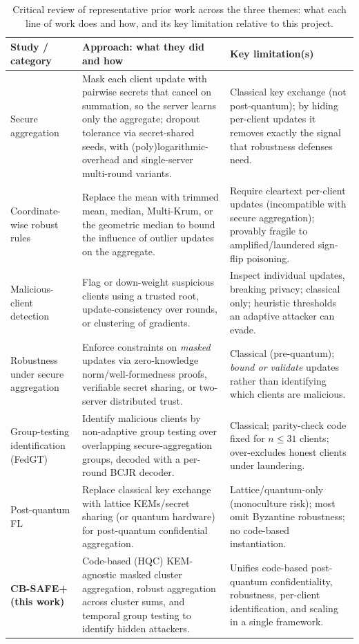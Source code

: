 \documentclass[conference]{IEEEtran}
\begin{document}
\begin{table}[t]
\caption{Critical review of representative prior work across the three themes: what
each line of work does and how, and its key limitation relative to this project.}
\label{tab:lit}
\centering
\footnotesize
\renewcommand{\arraystretch}{1.3}
\begin{tabular}{@{}p{} p{} p{}@{}}
\toprule
\textbf{Study / category} & \textbf{Approach: what they did and how} & \textbf{Key limitation(s)}\\
\midrule
Secure aggregation \cite{bonawitz2017,bell2020,flamingo} &
Mask each client update with pairwise secrets that cancel on summation, so the server
learns only the aggregate; dropout tolerance via secret-shared seeds, with
(poly)logarithmic-overhead and single-server multi-round variants. &
Classical key exchange (not post-quantum); by hiding per-client updates it removes
exactly the signal that robustness defenses need.\\
Coordinate-wise robust rules \cite{blanchard2017,yin2018,bulyan,rfa} &
Replace the mean with trimmed mean, median, Multi-Krum, or the geometric median to
bound the influence of outlier updates on the aggregate. &
Require cleartext per-client updates (incompatible with secure aggregation); provably
fragile to amplified/laundered sign-flip poisoning.\\
Malicious-client detection \cite{fltrust,fldetector2022,flame2022} &
Flag or down-weight suspicious clients using a trusted root, update-consistency over
rounds, or clustering of gradients. &
Inspect individual updates, breaking privacy; classical only; heuristic thresholds an
adaptive attacker can evade.\\
Robustness under secure aggregation \cite{rofl,eiffel,elsa} &
Enforce constraints on \emph{masked} updates via zero-knowledge norm/well-formedness
proofs, verifiable secret sharing, or two-server distributed trust. &
Classical (pre-quantum); \emph{bound or validate} updates rather than identifying
which clients are malicious.\\
Group-testing identification (FedGT) \cite{fedgt} &
Identify malicious clients by non-adaptive group testing over overlapping
secure-aggregation groups, decoded with a per-round BCJR decoder. &
Classical; parity-check code fixed for $n\!\le\!31$ clients; over-excludes honest
clients under laundering.\\
Post-quantum FL \cite{pqsf2024,qinxu2025,byzpqfl2026,cqsa2026} &
Replace classical key exchange with lattice KEMs/secret sharing (or quantum hardware)
for post-quantum confidential aggregation. &
Lattice/quantum-only (monoculture risk); most omit Byzantine robustness; no code-based
instantiation.\\
\textbf{CB-SAFE+ (this work)} &
Code-based (HQC) KEM-agnostic masked cluster aggregation, robust aggregation across
cluster sums, and temporal group testing to identify hidden attackers. &
Unifies code-based post-quantum confidentiality, robustness, per-client
identification, and scaling in a single framework.\\
\bottomrule
\end{tabular}
\end{table}
\end{document}
